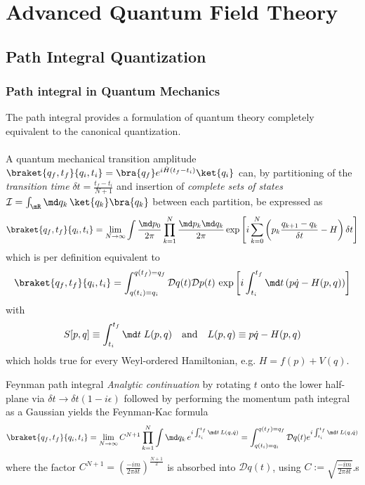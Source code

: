 \chapter{Advanced Quantum Field Theory}
\section{Path Integral Quantization}
\subsection{Path integral in Quantum Mechanics}
The path integral provides a formulation of quantum theory completely equivalent to the canonical quantization.\\
\\
A quantum mechanical transition amplitude $\braket{q_f,t_f}{q_i,t_i} = \bra{q_f} e^{i \hat{H}(t_f-t_i)} \ket{q_i}$ can, by partitioning of the \emph{transition time} $\delta t=\frac{t_f-t_i}{N+1}$ and insertion of \emph{complete sets of states} $\mathcal{I}= \int_{\mR} \md q_k \, \ket{q_k}\bra{q_k}$ between each partition, be expressed as 
\begin{equation}
	\braket{q_f,t_f}{q_i,t_i} = \lim_{N\rightarrow\infty} \int \frac{\md p_0}{2 \pi} \prod_{k=1}^{N} \frac{\md p_k \md q_k}{2 \pi} \exp\left[i \sum_{k=0}^{N} \left(p_k \frac{q_{k+1}-q_k}{\delta t} - H\right) \delta t\right]
\end{equation}
which is per definition equivalent to
\begin{equation}
	\braket{q_f,t_f}{q_i,t_i} = \int_{q(t_i)=q_i}^{q(t_f)=q_f}  \mathcal{D}q(t) \mathcal{D}p(t) \, \exp\left[i\int_{t_i}^{t_f} \md t \left(p \dot{q} - H(p,q) \right)\right]
\end{equation}
with 
\begin{equation}
	S[p,q] \equiv \int_{t_i}^{t_f} \md t \; L(p,q) \quad \mathrm{and} \quad L(p,q) \equiv p \dot{q} - H(p,q)
\end{equation}
which holds true for every Weyl-ordered Hamiltonian, e.g. $H=f(p)+V(q)$.\\
\begin{mybox}{Feynman path integral}
	\emph{Analytic continuation} by rotating $t$ onto the lower half-plane via $\delta t \rightarrow \delta t (1-i \epsilon)$ followed by performing the momentum path integral as a Gaussian yields the Feynman-Kac formula
	\begin{equation}
		\braket{q_f,t_f}{q_i,t_i} = \lim_{N\rightarrow\infty} C^{N+1} \prod_{k=1}^{N} \int \md q_k \, e^{i \int_{t_i}^{t_f} \md t \, L(q,\dot{q})}= \int_{q(t_i)=q_i}^{q(t_f)=q_f} \mathcal{D}q(t) e^{i \int_{t_i}^{t_f} \md t\, L(q,\dot{q})}
	\end{equation}
	where the factor $C^{N+1} = \left(\frac{-i m}{2 \pi \delta t}\right)^{\frac{N+1}{2}}$ is absorbed into $\mathcal{D}q(t)$, using $C:= \sqrt{\frac{-im}{2 \pi \delta t}}$.s
\end{mybox}
